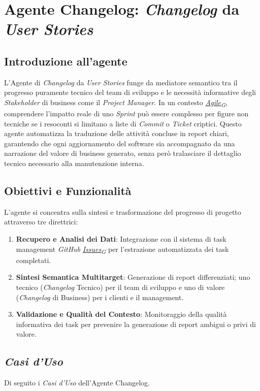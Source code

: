 \documentclass[12pt, a4paper]{article}
\newcommand{\urlglossario}{https://skynetunigroup.github.io/Code_Guardian/Documentazione/PB/glossario_v2.0.0.pdf} %
\newcommand{\glo}[2]{\href{\urlglossario\#nameddest=#2}{#1\textsubscript{G}}}
\begin{document}
\newpage
\section{Agente Changelog: \textit{Changelog} da \textit{User Stories}}

\subsection{Introduzione all'agente}
L'Agente di \textit{Changelog} da \textit{User Stories} funge da mediatore semantico tra il progresso puramente tecnico del team di sviluppo e le necessità informative degli \textit{Stakeholder} di business come il \textit{Project Manager}. In un contesto \textit{\glo{Agile}{agile}}, comprendere l'impatto reale di uno \textit{Sprint} può essere complesso per figure non tecniche se i resoconti si limitano a liste di \textit{Commit} o \textit{Ticket} criptici. Questo agente automatizza la traduzione delle attività concluse in report chiari, garantendo che ogni aggiornamento del software sia accompagnato da una narrazione del valore di business generato, senza però tralasciare il dettaglio tecnico necessario alla manutenzione interna.

\subsection{Obiettivi e Funzionalità}
L'agente si concentra sulla sintesi e trasformazione del progresso di progetto attraverso tre direttrici:
\begin{enumerate}
\item \textbf{Recupero e Analisi dei Dati}: Integrazione con il sistema di task management \textit{GitHub} \textit{\glo{Issues}{issue}} per l'estrazione automatizzata dei task completati.
\item \textbf{Sintesi Semantica Multitarget}: Generazione di report differenziati; uno tecnico (\textit{Changelog} Tecnico) per il team di sviluppo e uno di valore (\textit{Changelog} di Business) per i clienti e il management.
\item \textbf{Validazione e Qualità del Contesto}: Monitoraggio della qualità informativa dei task per prevenire la generazione di report ambigui o privi di valore.
\end{enumerate}

\newpage
\subsection{\textit{Casi d'Uso}}
Di seguito i \textit{Casi d'Uso} dell'Agente Changelog.
\end{document}
